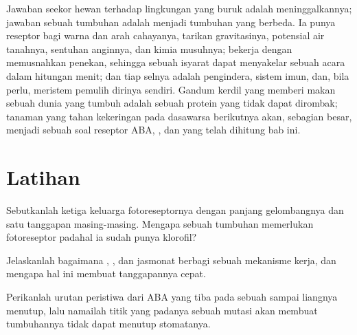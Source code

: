 \begin{remark}\label{rem:b3:plant-molecular-physiology:remark}
Jawaban seekor hewan terhadap lingkungan yang buruk adalah meninggalkannya; jawaban sebuah tumbuhan adalah
menjadi tumbuhan yang berbeda. Ia punya reseptor bagi warna dan
arah cahayanya, tarikan gravitasinya, potensial air
tanahnya, sentuhan anginnya, dan kimia musuhnya; 
bekerja dengan memusnahkan penekan, sehingga sebuah isyarat dapat menyakelar sebuah acara
dalam hitungan menit; dan tiap selnya adalah pengindera, sistem imun, dan,
bila perlu, meristem pemulih dirinya sendiri. Gandum kerdil yang memberi makan sebuah
dunia yang tumbuh adalah sebuah protein  yang tidak dapat dirombak;
tanaman yang tahan kekeringan pada dasawarsa berikutnya akan, sebagian besar, menjadi sebuah
soal reseptor ABA, , dan 
yang telah dihitung bab ini.
\end{remark}

\section{Latihan}

\begin{exercise}[$\star$]\label{exo:b3:plant-molecular-physiology:1}
Sebutkanlah ketiga keluarga fotoreseptornya dengan panjang gelombangnya dan satu
tanggapan masing-masing. Mengapa sebuah tumbuhan memerlukan fotoreseptor padahal ia sudah punya
klorofil?
\end{exercise}

\begin{exercise}[$\star$]\label{exo:b3:plant-molecular-physiology:2}
Jelaskanlah bagaimana , , dan jasmonat berbagi sebuah mekanisme
kerja, dan mengapa hal ini membuat tanggapannya cepat.
\end{exercise}

\begin{exercise}[$\star$]\label{exo:b3:plant-molecular-physiology:3}
Perikanlah urutan peristiwa dari ABA yang tiba pada sebuah  sampai
liangnya menutup, lalu namailah titik yang padanya sebuah mutasi akan membuat
tumbuhannya tidak dapat menutup stomatanya.
\end{exercise}

